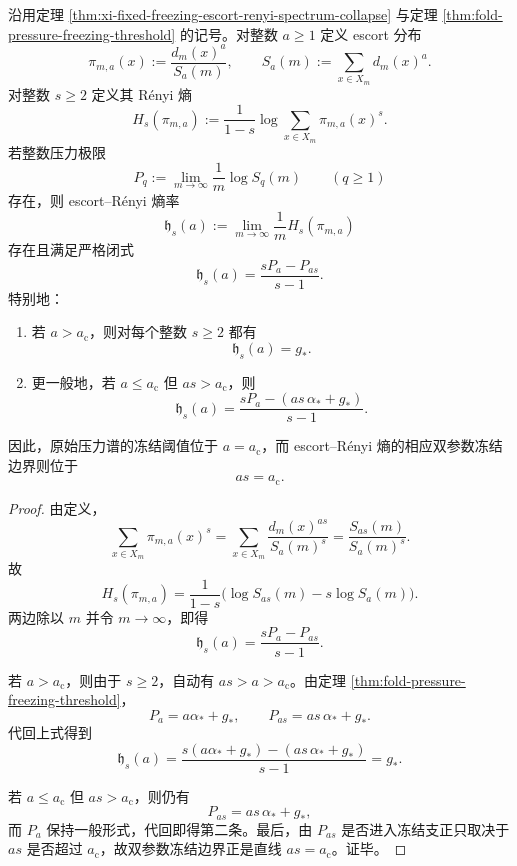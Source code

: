 \begin{theorem}\label{thm:xi-time-part65c-escort-renyi-two-parameter-freezing-line}
沿用定理 \ref{thm:xi-fixed-freezing-escort-renyi-spectrum-collapse} 与定理 \ref{thm:fold-pressure-freezing-threshold} 的记号。对整数 \(a\ge 1\) 定义 escort 分布
\[
\pi_{m,a}(x):=\frac{d_m(x)^a}{S_a(m)},
\qquad
S_a(m):=\sum_{x\in X_m}d_m(x)^a.
\]
对整数 \(s\ge 2\) 定义其 Rényi 熵
\[
H_s(\pi_{m,a})
:=
\frac{1}{1-s}\log\sum_{x\in X_m}\pi_{m,a}(x)^s.
\]
若整数压力极限
\[
P_q:=\lim_{m\to\infty}\frac{1}{m}\log S_q(m)
\qquad(q\ge 1)
\]
存在，则 escort--Rényi 熵率
\[
\mathfrak h_s(a):=
\lim_{m\to\infty}\frac{1}{m}H_s(\pi_{m,a})
\]
存在且满足严格闭式
\[
\boxed{\;
\mathfrak h_s(a)=\frac{sP_a-P_{as}}{s-1}.\;}
\]
特别地：
\begin{enumerate}
  \item 若 \(a>a_{\mathrm c}\)，则对每个整数 \(s\ge 2\) 都有
  \[
  \boxed{\;\mathfrak h_s(a)=g_*.\;}
  \]
  \item 更一般地，若 \(a\le a_{\mathrm c}\) 但 \(as>a_{\mathrm c}\)，则
  \[
  \boxed{\;
  \mathfrak h_s(a)
  =
  \frac{sP_a-(as\,\alpha_*+g_*)}{s-1}.\;}
  \]
\end{enumerate}
因此，原始压力谱的冻结阈值位于 \(a=a_{\mathrm c}\)，而 escort--Rényi 熵的相应双参数冻结边界则位于
\[
\boxed{\;as=a_{\mathrm c}.\;}
\]
\end{theorem}
\begin{proof}
由定义，
\[
\sum_{x\in X_m}\pi_{m,a}(x)^s
=
\sum_{x\in X_m}\frac{d_m(x)^{as}}{S_a(m)^s}
=
\frac{S_{as}(m)}{S_a(m)^s}.
\]
故
\[
H_s(\pi_{m,a})
=
\frac{1}{1-s}\bigl(\log S_{as}(m)-s\log S_a(m)\bigr).
\]
两边除以 \(m\) 并令 \(m\to\infty\)，即得
\[
\mathfrak h_s(a)=\frac{sP_a-P_{as}}{s-1}.
\]

若 \(a>a_{\mathrm c}\)，则由于 \(s\ge 2\)，自动有 \(as>a>a_{\mathrm c}\)。由定理 \ref{thm:fold-pressure-freezing-threshold}，
\[
P_a=a\alpha_*+g_*,
\qquad
P_{as}=as\,\alpha_*+g_*.
\]
代回上式得到
\[
\mathfrak h_s(a)
=
\frac{s(a\alpha_*+g_*)-(as\,\alpha_*+g_*)}{s-1}
=
g_*.
\]

若 \(a\le a_{\mathrm c}\) 但 \(as>a_{\mathrm c}\)，则仍有
\[
P_{as}=as\,\alpha_*+g_*,
\]
而 \(P_a\) 保持一般形式，代回即得第二条。最后，由 \(P_{as}\) 是否进入冻结支正只取决于 \(as\) 是否超过 \(a_{\mathrm c}\)，故双参数冻结边界正是直线 \(as=a_{\mathrm c}\)。证毕。
\end{proof}

